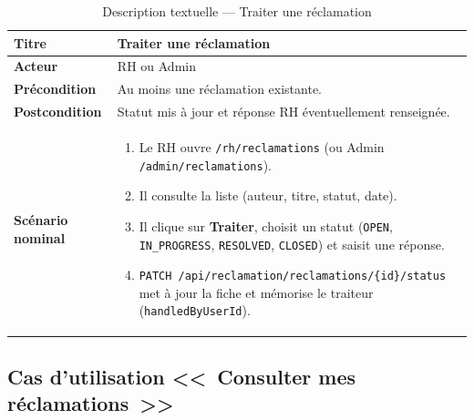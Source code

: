 \begin{table}[htbp]
  \centering
  \small
  \caption{Description textuelle --- Traiter une réclamation}
  \label{tab:uc-process-reclamation}
  \begin{tabular}{|p{3.0cm}|p{10.2cm}|}
    \hline
    \textbf{Titre} & Traiter une réclamation \\
    \hline
    \textbf{Acteur} & RH ou Admin \\
    \hline
    \textbf{Précondition} & Au moins une réclamation existante. \\
    \hline
    \textbf{Postcondition} & Statut mis à jour et réponse RH éventuellement renseignée. \\
    \hline
    \textbf{Scénario nominal}
    &
    \begin{enumerate}[leftmargin=*,itemsep=0.15em,topsep=0.2em]
      \item Le RH ouvre \texttt{/rh/reclamations} (ou Admin
            \texttt{/admin/reclamations}).
      \item Il consulte la liste (auteur, titre, statut, date).
      \item Il clique sur \textbf{Traiter}, choisit un statut
            (\texttt{OPEN}, \texttt{IN\_PROGRESS}, \texttt{RESOLVED},
            \texttt{CLOSED}) et saisit une réponse.
      \item \texttt{PATCH /api/reclamation/reclamations/\{id\}/status}
            met à jour la fiche et mémorise le traiteur
            (\texttt{handledByUserId}).
    \end{enumerate}
    \\
    \hline
  \end{tabular}
\end{table}


\subsection{Cas d'utilisation <<~Consulter mes réclamations~>>}

